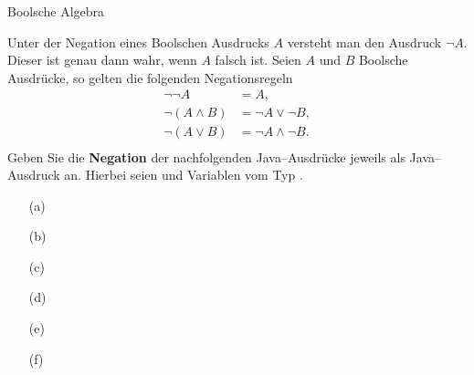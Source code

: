\begin{frame}[t]%
\medskip

\begin{exercise}{Boolsche Algebra}
\begin{body}
Unter der Negation eines Boolschen Ausdrucks $A$ versteht man den Ausdruck $\neg A$. Dieser ist genau dann wahr, wenn $A$ falsch ist. Seien $A$ und $B$ Boolsche Ausdrücke, so gelten die folgenden Negationsregeln
\begin{align*}
\neg \neg A &= A,\\
\neg (A \wedge B) &= \neg A \vee \neg B,\\
\neg (A \vee B)   &= \neg A \wedge \neg B. \\
\end{align*}
Geben Sie die \textbf{Negation} der nachfolgenden Java--Ausdrücke jeweils als Java--Ausdruck an. Hierbei seien  und  Variablen vom Typ .\\[1em]
\begin{center}
\begin{minipage}{0.35\textwidth}
\begin{itemize}
\item[(a)] 
\item[(b)] 
\item[(c)] 
\end{itemize}
\end{minipage}
\quad
\begin{minipage}{0.6\textwidth}
\begin{itemize}
\item[(d)] 
\item[(e)] 
\item[(f)] 
\end{itemize}
\end{minipage}
\end{center}
\end{body}
\end{exercise}

\end{frame}
